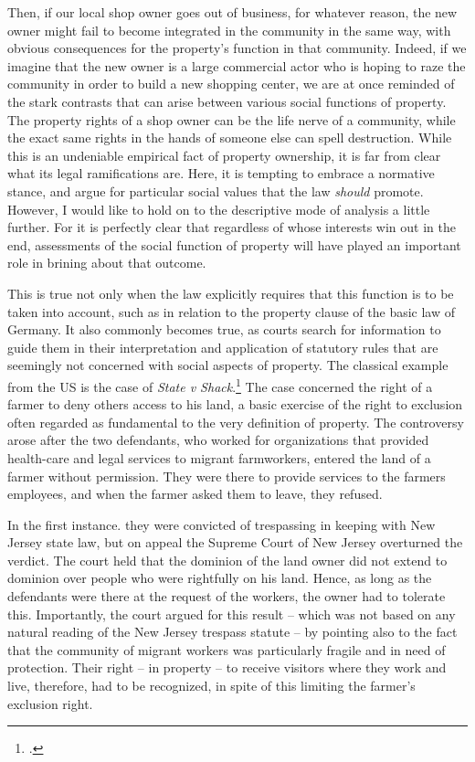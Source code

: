 Then, if our local shop owner goes out of business, for whatever reason, the new owner might fail to become integrated in the community in the same way, with obvious consequences for the property's function in that community. Indeed, if we imagine that the new owner is a large commercial actor who is hoping to raze the community in order to build a new shopping center, we are at once reminded of the stark contrasts that can arise between various social functions of property. The property rights of a shop owner can be the life nerve of a community, while the exact same rights in the hands of someone else can spell destruction. While this is an undeniable empirical fact of property ownership, it is far from clear what its legal ramifications are. Here, it is tempting to embrace a normative stance, and argue for particular social values that the law {\it should} promote. However, I would like to hold on to the descriptive mode of analysis a little further. For it is perfectly clear that regardless of whose interests win out in the end, assessments of the social function of property will have played an important role in brining about that outcome.

This is true not only when the law explicitly requires that this function is to be taken into account, such as in relation to the property clause of the basic law of Germany. It also commonly becomes true, as courts search for information to guide them in their interpretation and application of statutory rules that are seemingly not concerned with social aspects of property. The classical example from the US is the case of {\it State v Shack}.\footcite{shack71} The case concerned the right of a farmer to deny others access to his land, a basic exercise of the right to exclusion often regarded as fundamental to the very definition of property. The controversy arose after the two defendants, who worked for organizations that provided health-care and legal services to migrant farmworkers, entered the land of a farmer without permission. They were there to provide services to the farmers employees, and when the farmer asked them to leave, they refused.

In the first instance. they were convicted of trespassing in keeping with New Jersey state law, but on appeal the Supreme Court of New Jersey overturned the verdict. The court held that the dominion of the land owner did not extend to dominion over people who were rightfully on his land. Hence, as long as the defendants were there at the request of the workers, the owner had to tolerate this. Importantly, the court argued for this result -- which was not based on any natural reading of the New Jersey trespass statute -- by pointing also to the fact that the community of migrant workers was particularly fragile and in need of protection. Their right -- in property -- to receive visitors where they work and live, therefore, had to be recognized, in spite of this limiting the farmer's exclusion right.

